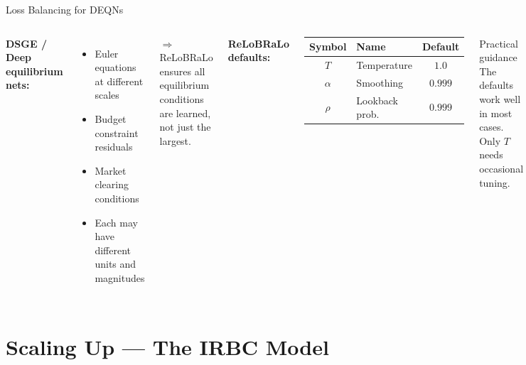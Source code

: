 \documentclass[aspectratio=169,11pt]{beamer}
\begin{document}
\begin{frame}{Loss Balancing for DEQNs}
\begin{columns}[T]
\textbf{DSGE / Deep equilibrium nets:}
\begin{itemize}
    \item Euler equations at different scales
    \item Budget constraint residuals
    \item Market clearing conditions
    \item Each may have different units and magnitudes
\end{itemize}

\vspace{0.3em}
$\Rightarrow$ ReLoBRaLo ensures all equilibrium conditions are learned, not just the largest.

\textbf{ReLoBRaLo defaults:}
\begin{center}
\renewcommand{\arraystretch}{1.4}
\begin{tabular}{@{}clc@{}}
\toprule
\textbf{Symbol} & \textbf{Name} & \textbf{Default} \\
\midrule
$T$ & Temperature & $1.0$ \\
$\alpha$ & Smoothing & $0.999$ \\
$\rho$ & Lookback prob. & $0.999$ \\
\bottomrule
\end{tabular}
\end{center}

\vspace{0.3em}
\begin{block}{Practical guidance}
The defaults work well in most cases. Only $T$ needs occasional tuning.
\end{block}
\end{columns}
\end{frame}



\section{Scaling Up --- The IRBC Model}
\end{document}

